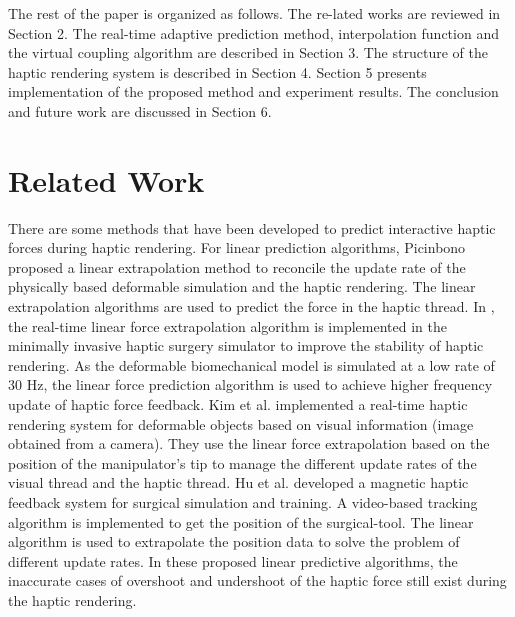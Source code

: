 \documentclass[10pt,journal,cspaper,compsoc]{IEEEtran}
\begin{document}
The rest of the paper is organized as follows. The re-lated works are reviewed in Section 2. The real-time adaptive prediction method, interpolation function and the virtual coupling algorithm are described in Section 3.  The structure of the haptic rendering system is described in Section 4. Section 5 presents implementation of the proposed method and experiment results. The conclusion and future work are discussed in Section 6.

































\section{Related Work}
There are some methods that have been developed to predict interactive haptic forces during haptic rendering. For linear prediction algorithms, Picinbono \cite{no04} proposed a linear extrapolation method to reconcile the update rate of the physically based deformable simulation and the haptic rendering. The linear extrapolation algorithms are used to predict the force in the haptic thread. In \cite{no05,no06,no07}, the real-time linear force extrapolation algorithm is implemented in the minimally invasive haptic surgery simulator to improve the stability of haptic rendering. As the deformable biomechanical model is simulated at a low rate of 30 Hz, the linear force prediction algorithm is used to achieve higher frequency update of haptic force feedback. Kim et al. \cite{no08} implemented a real-time haptic rendering system for deformable objects based on visual information (image obtained from a camera). They use the linear force extrapolation based on the position of the manipulator's tip to manage the different update rates of the visual thread and the haptic thread. Hu et al. \cite{no09} developed a magnetic haptic feedback system for surgical simulation and training.  A video-based tracking algorithm is implemented to get the position of the surgical-tool. The linear algorithm is used to extrapolate the position data to solve the problem of different update rates. In these proposed linear predictive algorithms, the inaccurate cases of overshoot and undershoot of the haptic force still exist during the haptic rendering.
\end{document}
